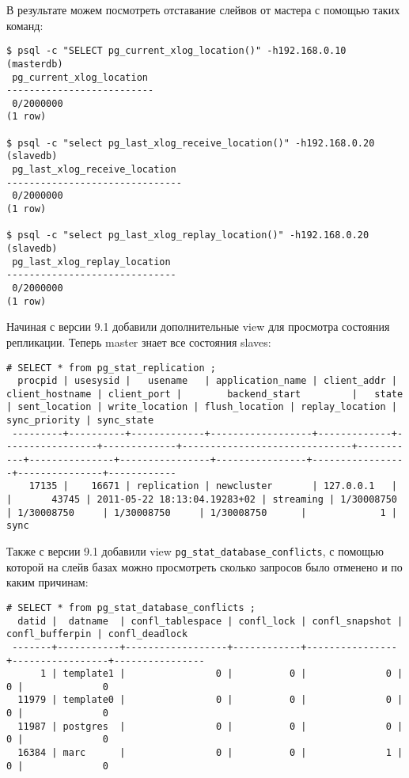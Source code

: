 В результате можем посмотреть отставание слейвов от мастера с помощью таких команд:

\begin{lstlisting}[label=lst:streaming15,caption=Тестирование репликации]
$ psql -c "SELECT pg_current_xlog_location()" -h192.168.0.10 (masterdb)
 pg_current_xlog_location
--------------------------
 0/2000000
(1 row)

$ psql -c "select pg_last_xlog_receive_location()" -h192.168.0.20 (slavedb)
 pg_last_xlog_receive_location
-------------------------------
 0/2000000
(1 row)

$ psql -c "select pg_last_xlog_replay_location()" -h192.168.0.20 (slavedb)
 pg_last_xlog_replay_location
------------------------------
 0/2000000
(1 row)
\end{lstlisting}

Начиная с версии 9.1 добавили дополнительные view для просмотра состояния репликации. Теперь master знает все состояния slaves:

\begin{lstlisting}[label=lst:streaming151,caption=Состояние слейвов]
# SELECT * from pg_stat_replication ;
  procpid | usesysid |   usename   | application_name | client_addr | client_hostname | client_port |        backend_start         |   state   | sent_location | write_location | flush_location | replay_location | sync_priority | sync_state
 ---------+----------+-------------+------------------+-------------+-----------------+-------------+------------------------------+-----------+---------------+----------------+----------------+-----------------+---------------+------------
    17135 |    16671 | replication | newcluster       | 127.0.0.1   |                 |       43745 | 2011-05-22 18:13:04.19283+02 | streaming | 1/30008750    | 1/30008750     | 1/30008750     | 1/30008750      |             1 | sync
\end{lstlisting}

Также с версии 9.1 добавили view \lstinline!pg_stat_database_conflicts!, с помощью которой на слейв базах можно просмотреть сколько запросов было отменено и по каким причинам:

\begin{lstlisting}[label=lst:streaming152,caption=Состояние слейва]
# SELECT * from pg_stat_database_conflicts ;
  datid |  datname  | confl_tablespace | confl_lock | confl_snapshot | confl_bufferpin | confl_deadlock
 -------+-----------+------------------+------------+----------------+-----------------+----------------
      1 | template1 |                0 |          0 |              0 |               0 |              0
  11979 | template0 |                0 |          0 |              0 |               0 |              0
  11987 | postgres  |                0 |          0 |              0 |               0 |              0
  16384 | marc      |                0 |          0 |              1 |               0 |              0
\end{lstlisting}

